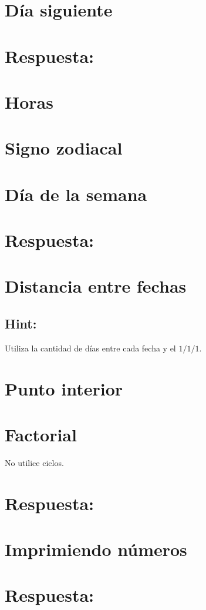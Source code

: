 \section{Día siguiente}

\ifshowanswers
\section*{Respuesta:}

\fi

\section{Horas}


\section{Signo zodiacal}


\section{Día de la semana}

\ifshowanswers
\section*{Respuesta:}

\fi

\section{Distancia entre fechas}

\ifshowanswers
\subsection*{Hint:} 
Utiliza la cantidad de días entre cada fecha y el $1/1/1$.
\fi

\section{Punto interior}


\section{Factorial}

No utilice ciclos.

\ifshowanswers
\section*{Respuesta:}

\fi

\section{Imprimiendo números}


\ifshowanswers
\section*{Respuesta:}

\fi